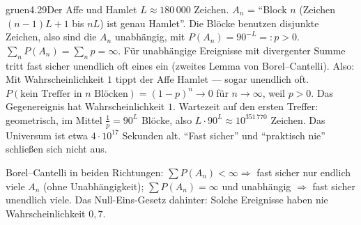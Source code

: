 \begin{loesungkarte}{gruen}{4.29}{Der Affe und Hamlet}
$L\approx180\,000$ Zeichen. $A_n$ = \enquote{Block $n$ (Zeichen $(n - 1)L + 1$ bis $nL$) ist genau Hamlet}. Die Blöcke benutzen disjunkte Zeichen, also sind die $A_n$ unabhängig, mit $P(A_n) = 90^{-L} =: p > 0$.
$\sum_nP(A_n) = \sum_np = \infty$. Für unabhängige Ereignisse mit divergenter Summe tritt fast sicher unendlich oft eines ein (zweites Lemma von Borel--Cantelli). Also: Mit Wahrscheinlichkeit $1$ tippt der Affe Hamlet --- sogar unendlich oft.
$P(\text{kein Treffer in } n \text{ Blöcken}) = (1 - p)^{n}\to0$ für $n\to\infty$, weil $p > 0$. Das Gegenereignis hat Wahrscheinlichkeit $1$.
Wartezeit auf den ersten Treffer: geometrisch, im Mittel $\frac1p = 90^{L}$ Blöcke, also $L\cdot90^{L}\approx10^{351\,770}$ Zeichen. Das Universum ist etwa $4\cdot10^{17}$ Sekunden alt. \enquote{Fast sicher} und \enquote{praktisch nie} schließen sich nicht aus.
\begin{mitnehmen}\kastentext
Borel--Cantelli in beiden Richtungen: $\sum P(A_n) < \infty\Rightarrow$ fast sicher nur endlich viele $A_n$ (ohne Unabhängigkeit); $\sum P(A_n) = \infty$ und unabhängig $\Rightarrow$ fast sicher unendlich viele. Das Null-Eins-Gesetz dahinter: Solche Ereignisse haben nie Wahrscheinlichkeit $0{,}7$.
\end{mitnehmen}
\end{loesungkarte}

